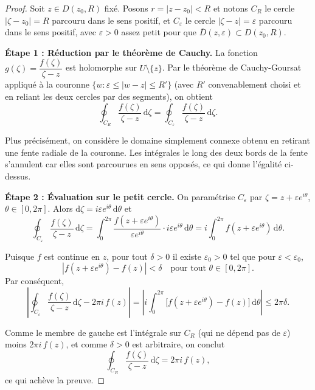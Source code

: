 \documentclass[12pt,a4paper,openany]{book}
\theoremstyle{definition}
\theoremstyle{plain}
\theoremstyle{remark}
\newcommand{\dd}{\mathrm{d}}
\newcommand{\abs}[1]{\left|#1\right|}
\begin{document}
\begin{proof}
Soit $z \in D(z_0,R)$ fixé. Posons $r = \abs{z - z_0} < R$ et notons
$C_R$ le cercle $\abs{\zeta - z_0} = R$ parcouru dans le sens positif,
et $C_\varepsilon$ le cercle $\abs{\zeta - z} = \varepsilon$ parcouru dans
le sens positif, avec $\varepsilon > 0$ assez petit pour que
$\overline{D}(z,\varepsilon) \subset D(z_0,R)$.

\medskip

\noindent\textbf{Étape 1 : Réduction par le théorème de Cauchy.}
La fonction $g(\zeta) = \dfrac{f(\zeta)}{\zeta - z}$ est holomorphe sur
$U \setminus \{z\}$. Par le théorème de Cauchy-Goursat appliqué à la
couronne $\{w : \varepsilon \leq \abs{w - z} \leq R'\}$ (avec $R'$
convenablement choisi et en reliant les deux cercles par des segments),
on obtient
\[
  \oint_{C_R} \frac{f(\zeta)}{\zeta - z} \, \dd\zeta
  = \oint_{C_\varepsilon} \frac{f(\zeta)}{\zeta - z} \, \dd\zeta.
\]

Plus précisément, on considère le domaine simplement connexe obtenu en
retirant une fente radiale de la couronne. Les intégrales le long des
deux bords de la fente s'annulent car elles sont parcourues en sens
opposés, ce qui donne l'égalité ci-dessus.

\medskip

\noindent\textbf{Étape 2 : Évaluation sur le petit cercle.}
On paramétrise $C_\varepsilon$ par $\zeta = z + \varepsilon e^{i\theta}$,
$\theta \in [0, 2\pi]$. Alors $\dd\zeta = i\varepsilon e^{i\theta}\,\dd\theta$
et
\[
  \oint_{C_\varepsilon} \frac{f(\zeta)}{\zeta - z}\,\dd\zeta
  = \int_0^{2\pi} \frac{f(z + \varepsilon e^{i\theta})}
    {\varepsilon e^{i\theta}} \cdot i\varepsilon e^{i\theta}\,\dd\theta
  = i \int_0^{2\pi} f(z + \varepsilon e^{i\theta})\,\dd\theta.
\]

Puisque $f$ est continue en $z$, pour tout $\delta > 0$ il existe
$\varepsilon_0 > 0$ tel que pour $\varepsilon < \varepsilon_0$,
\[
  \abs{f(z + \varepsilon e^{i\theta}) - f(z)} < \delta
  \quad \text{pour tout } \theta \in [0, 2\pi].
\]
Par conséquent,
\[
  \abs{\oint_{C_\varepsilon} \frac{f(\zeta)}{\zeta - z}\,\dd\zeta
       - 2\pi i \, f(z)}
  = \abs{i\int_0^{2\pi}\bigl[f(z + \varepsilon e^{i\theta}) - f(z)\bigr]
    \,\dd\theta}
  \leq 2\pi \delta.
\]

Comme le membre de gauche est l'intégrale sur $C_R$ (qui ne dépend pas
de $\varepsilon$) moins $2\pi i\,f(z)$, et comme $\delta > 0$ est
arbitraire, on conclut
\[
  \oint_{C_R} \frac{f(\zeta)}{\zeta - z}\,\dd\zeta = 2\pi i\,f(z),
\]
ce qui achève la preuve.
\end{proof}
\end{document}
